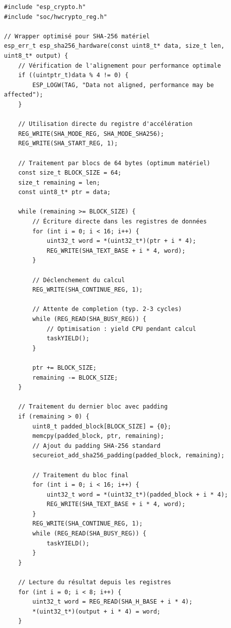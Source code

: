 \begin{lstlisting}[caption={Optimisations cryptographiques ESP32}]
#include "esp_crypto.h"
#include "soc/hwcrypto_reg.h"

// Wrapper optimisé pour SHA-256 matériel
esp_err_t esp_sha256_hardware(const uint8_t* data, size_t len, uint8_t* output) {
    // Vérification de l'alignement pour performance optimale
    if ((uintptr_t)data % 4 != 0) {
        ESP_LOGW(TAG, "Data not aligned, performance may be affected");
    }
    
    // Utilisation directe du registre d'accélération
    REG_WRITE(SHA_MODE_REG, SHA_MODE_SHA256);
    REG_WRITE(SHA_START_REG, 1);
    
    // Traitement par blocs de 64 bytes (optimum matériel)
    const size_t BLOCK_SIZE = 64;
    size_t remaining = len;
    const uint8_t* ptr = data;
    
    while (remaining >= BLOCK_SIZE) {
        // Écriture directe dans les registres de données
        for (int i = 0; i < 16; i++) {
            uint32_t word = *(uint32_t*)(ptr + i * 4);
            REG_WRITE(SHA_TEXT_BASE + i * 4, word);
        }
        
        // Déclenchement du calcul
        REG_WRITE(SHA_CONTINUE_REG, 1);
        
        // Attente de completion (typ. 2-3 cycles)
        while (REG_READ(SHA_BUSY_REG)) {
            // Optimisation : yield CPU pendant calcul
            taskYIELD();
        }
        
        ptr += BLOCK_SIZE;
        remaining -= BLOCK_SIZE;
    }
    
    // Traitement du dernier bloc avec padding
    if (remaining > 0) {
        uint8_t padded_block[BLOCK_SIZE] = {0};
        memcpy(padded_block, ptr, remaining);
        // Ajout du padding SHA-256 standard
        secureiot_add_sha256_padding(padded_block, remaining);
        
        // Traitement du bloc final
        for (int i = 0; i < 16; i++) {
            uint32_t word = *(uint32_t*)(padded_block + i * 4);
            REG_WRITE(SHA_TEXT_BASE + i * 4, word);
        }
        REG_WRITE(SHA_CONTINUE_REG, 1);
        while (REG_READ(SHA_BUSY_REG)) {
            taskYIELD();
        }
    }
    
    // Lecture du résultat depuis les registres
    for (int i = 0; i < 8; i++) {
        uint32_t word = REG_READ(SHA_H_BASE + i * 4);
        *(uint32_t*)(output + i * 4) = word;
    }
    

\end{lstlisting}
